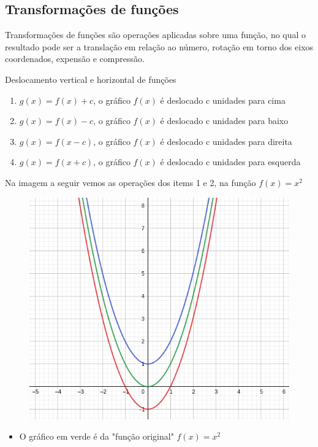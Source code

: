 \begin{multicols*}{2}
    \subsection*{Transformações de funções}
    Transformações de funções são operações aplicadas sobre uma função, no qual o  resultado pode 			ser a translação em relação ao número, rotação em torno dos eixos coordenados, expensão e 				compressão.

    Deslocamento vertical e horizontal de funções
    \begin{enumerate}[wide, labelwidth=!, labelindent=0pt]
        \item $g(x) = f(x) + c$, o gráfico $f(x)$ é deslocado c unidades para cima
        \item $g(x) = f(x) - c $, o gráfico $f(x)$ é deslocado c unidades para baixo
        \item $g(x) = f(x - c) $, o gráfico $f(x)$ é deslocado c unidades para direita
        \item $g(x) = f(x + c) $, o gráfico $f(x)$ é deslocado c unidades para esquerda
    \end{enumerate}
    Na imagem a seguir vemos as operações dos items 1 e 2, na função $f(x) = x^2$
    \begin{figure}[H]
        \centering
        \includegraphics[scale=0.4]{assets/rafael/img7.png}
    \end{figure}
    \begin{itemize}[wide, labelwidth=!, labelindent=0pt]
        \item O gráfico em verde é da "função original" $f(x) = x^2$

\end{itemize}
\end{multicols*}

